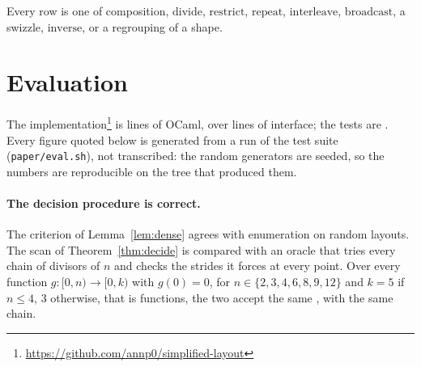 \documentclass[11pt]{article}
\theoremstyle{definition}
\newcommand{\divideop}{\mathrm{divide}}
\newcommand{\repeatop}{\mathrm{repeat}}
\newcommand{\interleave}{\mathrm{interleave}}
\newcommand{\broadcast}{\mathrm{broadcast}}
\newcommand{\restrict}{\mathrm{restrict}}
\begin{document}
Every row is one of composition, $\divideop$, $\restrict$, $\repeatop$,
$\interleave$, $\broadcast$, a swizzle, $\mathrm{inverse}$, or a regrouping of
a shape.

\section{Evaluation}\label{sec:eval}

The implementation\footnote{\url{https://github.com/annp0/simplified-layout}}
is \evalLibLines{} lines of OCaml, over \evalLibMliLines{} lines of
interface; the tests are \evalTestLines{}. Every figure quoted below is
generated from a run of the test suite (\texttt{paper/eval.sh}), not
transcribed: the random generators are seeded, so the numbers are
reproducible on the tree that produced them.

\paragraph{The decision procedure is correct.} The criterion of
Lemma~\ref{lem:dense} agrees with enumeration on \evalDenseRandom{} random
layouts. The scan of
Theorem~\ref{thm:decide} is compared with an oracle that tries every chain of
divisors of $n$ and checks the strides it forces at every point. Over every
function $g : [0,n) \to [0,k)$ with $g(0) = 0$, for
$n \in \{2,3,4,6,8,9,12\}$ and $k = 5$ if $n \le 4$, $3$ otherwise, that is
\evalAxisFunctions{} functions, the two accept the same \evalAxisStrided{},
with the same chain.
\end{document}
